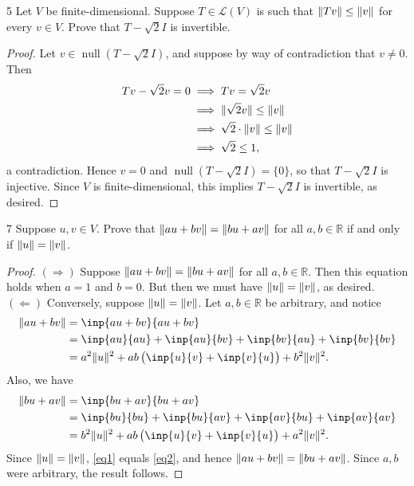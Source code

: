 \documentclass{extarticle}
\newenvironment{problem}[1]{\begin{prob*}{#1}{}}{\end{prob*}}
\newcommand{\R}{\mathbb{R}}
\newcommand{\Hom}{\mathcal{L}}
\DeclareMathOperator{\Null}{null}
\DeclarePairedDelimiter\Norm{\lVert}{\rVert}
\begin{document}
\begin{problem}{5}
Let $V$ be finite-dimensional.  Suppose $T\in\Hom(V)$ is such that $\Norm{Tv}\leq \Norm{v}$ for every $v\in V$.  Prove that $T-\sqrt{2}I$ is invertible.
\end{problem}
\begin{proof}
Let $v\in\Null(T - \sqrt{2}I)$, and suppose by way of contradiction that $v\neq 0$.  Then
\begin{align*}
Tv - \sqrt{2}v = 0 &\implies Tv = \sqrt{2}v\\
&\implies \Norm{\sqrt{2}v}\leq \Norm{v}\\
&\implies \sqrt{2}\cdot \Norm{v}\leq \Norm{v}\\
&\implies \sqrt{2} \leq 1,
\end{align*}
a contradiction.  Hence $v = 0$ and $\Null(T - \sqrt{2}I) =\{0\}$, so that $T-\sqrt{2}I$ is injective.  Since $V$ is finite-dimensional, this implies $T-\sqrt{2}I$ is invertible, as desired.
\end{proof}

\begin{problem}{7}
Suppose $u,v\in V$.  Prove that $\Norm{au + bv} = \Norm{bu + av}$ for all $a,b\in\R$ if and only if $\Norm{u} = \Norm{v}$.
\end{problem}
\begin{proof}
$(\Rightarrow)$ Suppose $\Norm{au + bv} = \Norm{bu + av}$ for all $a,b\in\R$.  Then this equation holds when $a = 1$ and $b = 0$.  But then we must have $\Norm{u} = \Norm{v}$, as desired.\\
\indent $(\Leftarrow)$ Conversely, suppose $\Norm{u} = \Norm{v}$.  Let $a,b\in\R$ be arbitrary, and notice
\begin{align}
\Norm{au + bv} &= \inp{au + bv}{au + bv} \nonumber \\
&= \inp{au}{au} + \inp{au}{bv} + \inp{bv}{au} + \inp{bv}{bv} \nonumber \\
&= a^2\Norm{u}^2 + ab\left(\inp{u}{v} + \inp{v}{u}\right) + b^2\Norm{v}^2. \label{eq1}
\end{align}
Also, we have
\begin{align}
\Norm{bu + av} &= \inp{bu + av}{bu + av} \nonumber \\
&= \inp{bu}{bu} + \inp{bu}{av} + \inp{av}{bu} + \inp{av}{av} \nonumber \\
&= b^2\Norm{u}^2 + ab\left(\inp{u}{v} + \inp{v}{u}\right) + a^2\Norm{v}^2. \label{eq2}
\end{align}
Since $\Norm{u} = \Norm{v}$, \eqref{eq1} equals \eqref{eq2}, and hence $\Norm{au + bv} = \Norm{bu + av}$.  Since $a,b$ were arbitrary, the result follows.
\end{proof}
\end{document}
